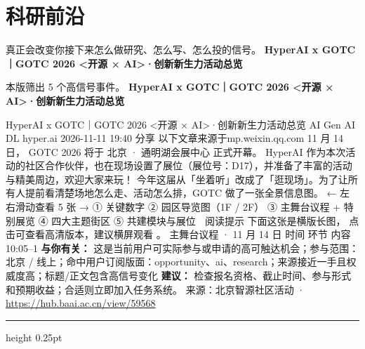 \documentclass[10.5pt]{ctexart}
\begin{document}
\section*{科研前沿}
{\color{ormuted} 真正会改变你接下来怎么做研究、怎么写、怎么投的信号。}
\vspace{2mm}
{\LARGE\bfseries HyperAI x GOTC｜GOTC 2026 <开源 × AI>·创新新生力活动总览}\par
\vspace{1mm}
{\color{ormuted} 本版筛出 5 个高信号事件。}
\vspace{3mm}
{\Large\bfseries HyperAI x GOTC｜GOTC 2026 <开源 × AI>·创新新生力活动总览}\par
HyperAI x GOTC｜GOTC 2026 <开源 × AI>·创新新生力活动总览 AI Gen AI DL hyper.ai 2026-11-11 19:40 分享 以下文章来源于mp.weixin.qq.com 11 月 14 日， GOTC 2026 将于 北京 · 通明湖会展中心 正式开幕。 HyperAI 作为本次活动的社区合作伙伴，也在现场设置了展位（展位号：D17），并准备了丰富的活动与精美周边，欢迎大家来玩！ 今年这届从「坐着听」改成了「逛现场」。为了让所有人提前看清楚场地怎么走、活动怎么排，GOTC 做了一张全景信息图。 ← 左右滑动查看 5 张 → ① 关键数字 ② 园区导览图（1F / 2F） ③ 主舞台议程 + 特别展览 ④ 四大主题街区 ⑤ 共建模块与展位 📱 阅读提示 下面这张是横版长图， 点击可查看高清版本，建议横屏观看 。 主舞台议程 · 11 月 14 日 时间 环节 内容 10:05–1
\textbf{与你有关：} 这是当前用户可实际参与或申请的高可触达机会；参与范围：北京 / 线上；命中用户订阅版面：opportunity、ai、research；来源接近一手且权威度高；标题/正文包含高信号变化
\textbf{建议：} 检查报名资格、截止时间、参与形式和预期收益；合适则立即加入任务系统。
{\footnotesize\color{ormuted} 来源：北京智源社区活动 · \url{https://hub.baai.ac.cn/view/59568}}
\vspace{4mm}
\hrule height 0.25pt
\vspace{3mm}
\end{document}
